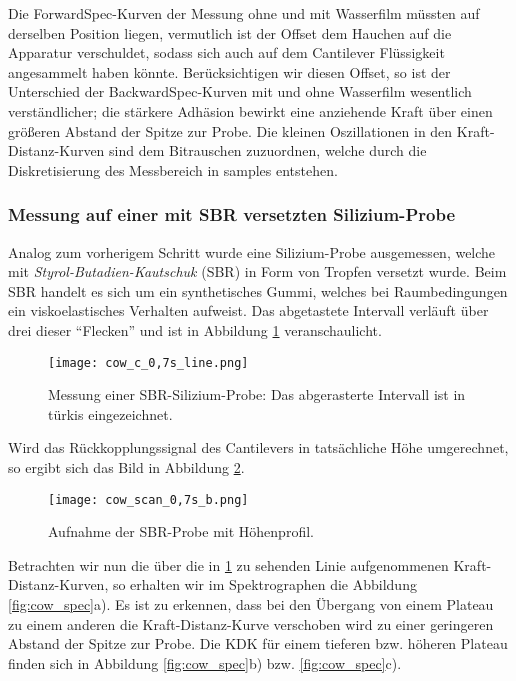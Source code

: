 Die ForwardSpec-Kurven der Messung ohne und mit Wasserfilm müssten auf derselben Position liegen, vermutlich ist der Offset dem Hauchen auf die Apparatur verschuldet, sodass sich auch auf dem Cantilever Flüssigkeit angesammelt haben könnte.
Berücksichtigen wir diesen Offset, so ist der Unterschied der BackwardSpec-Kurven mit und ohne Wasserfilm wesentlich verständlicher; die stärkere Adhäsion bewirkt eine anziehende Kraft über einen größeren Abstand der Spitze zur Probe.
Die kleinen Oszillationen in den Kraft-Distanz-Kurven sind dem Bitrauschen zuzuordnen, welche durch die Diskretisierung des Messbereich in samples entstehen.
\subsubsection{Messung auf einer mit SBR versetzten Silizium-Probe}
Analog zum vorherigem Schritt wurde eine Silizium-Probe ausgemessen, welche mit \emph{Styrol-Butadien-Kautschuk} (SBR) in Form von Tropfen versetzt wurde. Beim SBR handelt es sich um ein synthetisches Gummi, welches bei Raumbedingungen ein viskoelastisches Verhalten aufweist.
Das abgetastete Intervall verläuft über drei dieser ``Flecken'' und ist in Abbildung \ref{fig:cow_line} veranschaulicht.
\begin{figure}[h]
	\centering
	\texttt{[image: cow\_c\_0,7s\_line.png]}
	\caption[Messung einer SBR-Silizium-Probe]{Messung einer SBR-Silizium-Probe: Das abgerasterte Intervall ist in türkis eingezeichnet.}
	\label{fig:cow_line}
\end{figure}
Wird das Rückkopplungssignal des Cantilevers in tatsächliche Höhe umgerechnet, so ergibt sich das Bild in Abbildung \ref{fig:cow_z}.
\begin{figure}[h]
	\centering
	\texttt{[image: cow\_scan\_0,7s\_b.png]}
	\caption{Aufnahme der SBR-Probe mit Höhenprofil.}
	\label{fig:cow_z}
\end{figure}
Betrachten wir nun die über die in \ref{fig:cow_line} zu sehenden Linie aufgenommenen Kraft-Distanz-Kurven, so erhalten wir im Spektrographen die Abbildung \ref{fig:cow_spec}a). Es ist zu erkennen, dass bei den Übergang von einem Plateau zu einem anderen die Kraft-Distanz-Kurve verschoben wird zu einer geringeren Abstand der Spitze zur Probe. Die KDK für einem tieferen bzw. höheren Plateau finden sich in Abbildung \ref{fig:cow_spec}b) bzw. \ref{fig:cow_spec}c).
